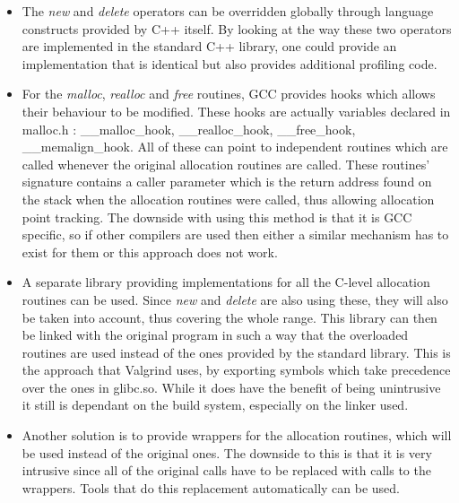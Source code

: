 \begin{itemize}
\item The \textit{new} and \textit{delete} operators can be overridden globally through language constructs provided by C++ itself. By looking at the way these two operators are implemented in the standard C++ library, one could provide an implementation that is identical but also provides additional profiling code.
\item For the \textit{malloc}, \textit{realloc} and \textit{free} routines, GCC provides hooks which allows their behaviour to be modified. These hooks are actually variables declared in malloc.h : \_\_malloc\_hook, \_\_realloc\_hook, \_\_free\_hook, \_\_memalign\_hook. All of these can point to independent routines which are called whenever the original allocation routines are called. These routines' signature contains a caller parameter which is the return address found on the stack when the allocation routines were called, thus allowing allocation point tracking\cite{GCCman}. The downside with using this method is that it is GCC specific, so if other compilers are used then either a similar mechanism has to exist for them or this approach does not work.
\item A separate library providing implementations for all the C-level allocation routines can be used. Since \textit{new} and \textit{delete} are also using these, they will also be taken into account, thus covering the whole range. This library can then be linked with the original program in such a way that the overloaded routines are used instead of the ones provided by the standard library. This is the approach that Valgrind uses, by exporting symbols which take precedence over the ones in glibc.so\cite{Seward02}. While it does have the benefit of being unintrusive it still is dependant on the build system, especially on the linker used.
\item Another solution is to provide wrappers for the allocation routines, which will be used instead of the original ones. The downside to this is that it is very intrusive since all of the original calls have to be replaced with calls to the wrappers. Tools that do this replacement automatically can be used.
\end{itemize}

